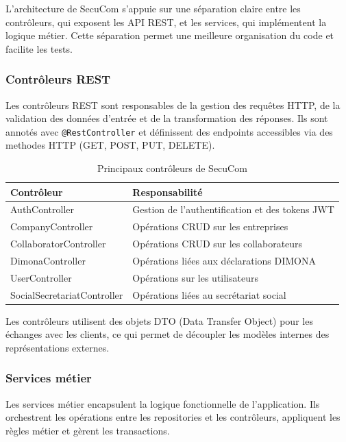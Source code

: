L'architecture de SecuCom s'appuie sur une séparation claire entre les contrôleurs, qui exposent les API REST, et les services, qui implémentent la logique métier. Cette séparation permet une meilleure organisation du code et facilite les tests.

\subsubsection{Contrôleurs REST}

Les contrôleurs REST sont responsables de la gestion des requêtes HTTP, de la validation des données d'entrée et de la transformation des réponses. Ils sont annotés avec \texttt{@RestController} et définissent des endpoints accessibles via des methodes HTTP (GET, POST, PUT, DELETE).

\vspace{0.5cm}

\begin{table}[H]
\centering
\begin{tabular}{|l|p{10cm}|}
\hline
\textbf{Contrôleur} & \textbf{Responsabilité} \\
\hline
AuthController & Gestion de l'authentification et des tokens JWT \\
\hline
CompanyController & Opérations CRUD sur les entreprises \\
\hline
CollaboratorController & Opérations CRUD sur les collaborateurs \\
\hline
DimonaController & Opérations liées aux déclarations DIMONA \\
\hline
UserController & Opérations sur les utilisateurs \\
\hline
SocialSecretariatController & Opérations liées au secrétariat social \\
\hline
\end{tabular}
\caption{Principaux contrôleurs de SecuCom}
\end{table}

\vspace{0.5cm}

Les contrôleurs utilisent des objets DTO (Data Transfer Object) pour les échanges avec les clients, ce qui permet de découpler les modèles internes des représentations externes.

\subsubsection{Services métier}

Les services métier encapsulent la logique fonctionnelle de l'application. Ils orchestrent les opérations entre les repositories et les contrôleurs, appliquent les règles métier et gèrent les transactions.

